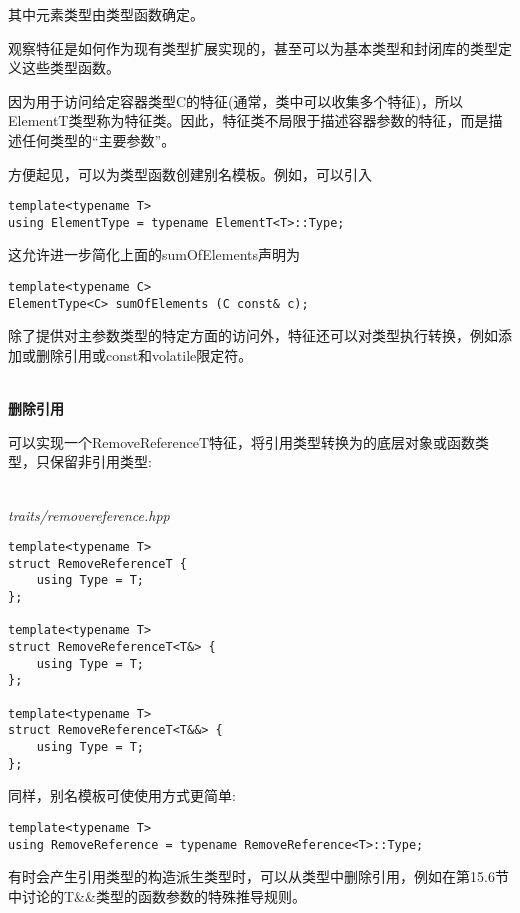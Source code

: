 其中元素类型由类型函数确定。

观察特征是如何作为现有类型扩展实现的，甚至可以为基本类型和封闭库的类型定义这些类型函数。

因为用于访问给定容器类型C的特征(通常，类中可以收集多个特征)，所以ElementT类型称为特征类。因此，特征类不局限于描述容器参数的特征，而是描述任何类型的“主要参数”。

方便起见，可以为类型函数创建别名模板。例如，可以引入

\begin{lstlisting}[style=styleCXX]
template<typename T>
using ElementType = typename ElementT<T>::Type;
\end{lstlisting}

这允许进一步简化上面的sumOfElements声明为

\begin{lstlisting}[style=styleCXX]
template<typename C>
ElementType<C> sumOfElements (C const& c);
\end{lstlisting}


除了提供对主参数类型的特定方面的访问外，特征还可以对类型执行转换，例如添加或删除引用或const和volatile限定符。

\hspace*{\fill} \\ %
\noindent
\textbf{删除引用}

可以实现一个RemoveReferenceT特征，将引用类型转换为的底层对象或函数类型，只保留非引用类型:

\hspace*{\fill} \\ %
\noindent
\textit{traits/removereference.hpp}
\begin{lstlisting}[style=styleCXX]
template<typename T>
struct RemoveReferenceT {
	using Type = T;
};

template<typename T>
struct RemoveReferenceT<T&> {
	using Type = T;
};

template<typename T>
struct RemoveReferenceT<T&&> {
	using Type = T;
};
\end{lstlisting}

同样，别名模板可使使用方式更简单:

\begin{lstlisting}[style=styleCXX]
template<typename T>
using RemoveReference = typename RemoveReference<T>::Type;
\end{lstlisting}

有时会产生引用类型的构造派生类型时，可以从类型中删除引用，例如在第15.6节中讨论的T\&\&类型的函数参数的特殊推导规则。

